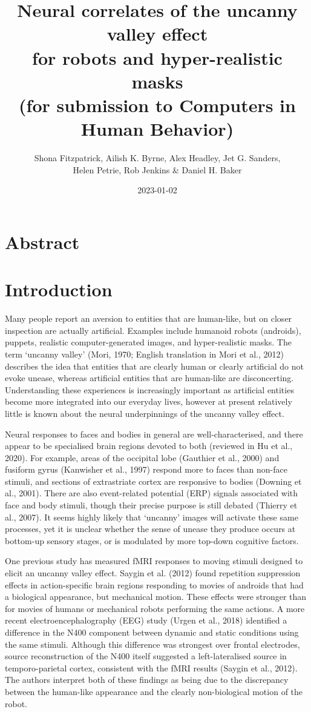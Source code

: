 \documentclass[
]{article}
\title{Neural correlates of the uncanny valley effect\\
for robots and hyper-realistic masks\\
(for submission to Computers in Human Behavior)}
\author{Shona Fitzpatrick, Ailish K. Byrne, Alex Headley, Jet G. Sanders,\\
Helen Petrie, Rob Jenkins \& Daniel H. Baker}
\date{2023-01-02}
\begin{document}
\maketitle

\hypertarget{abstract}{%
\section{Abstract}\label{abstract}}

\hypertarget{introduction}{%
\section{Introduction}\label{introduction}}

Many people report an aversion to entities that are human-like, but on closer inspection are actually artificial. Examples include humanoid robots (androids), puppets, realistic computer-generated images, and hyper-realistic masks. The term `uncanny valley' (Mori, 1970; English translation in Mori et al., 2012) describes the idea that entities that are clearly human or clearly artificial do not evoke unease, whereas artificial entities that are human-like are disconcerting. Understanding these experiences is increasingly important as artificial entities become more integrated into our everyday lives, however at present relatively little is known about the neural underpinnings of the uncanny valley effect.

Neural responses to faces and bodies in general are well-characterised, and there appear to be specialised brain regions devoted to both (reviewed in Hu et al., 2020). For example, areas of the occipital lobe (Gauthier et al., 2000) and fusiform gyrus (Kanwisher et al., 1997) respond more to faces than non-face stimuli, and sections of extrastriate cortex are responsive to bodies (Downing et al., 2001). There are also event-related potential (ERP) signals associated with face and body stimuli, though their precise purpose is still debated (Thierry et al., 2007). It seems highly likely that `uncanny' images will activate these same processes, yet it is unclear whether the sense of unease they produce occurs at bottom-up sensory stages, or is modulated by more top-down cognitive factors.

One previous study has measured fMRI responses to moving stimuli designed to elicit an uncanny valley effect. Saygin et al. (2012) found repetition suppression effects in action-specific brain regions responding to movies of androids that had a biological appearance, but mechanical motion. These effects were stronger than for movies of humans or mechanical robots performing the same actions. A more recent electroencephalography (EEG) study (Urgen et al., 2018) identified a difference in the N400 component between dynamic and static conditions using the same stimuli. Although this difference was strongest over frontal electrodes, source reconstruction of the N400 itself suggested a left-lateralised source in temporo-parietal cortex, consistent with the fMRI results (Saygin et al., 2012). The authors interpret both of these findings as being due to the discrepancy between the human-like appearance and the clearly non-biological motion of the robot.
\end{document}
